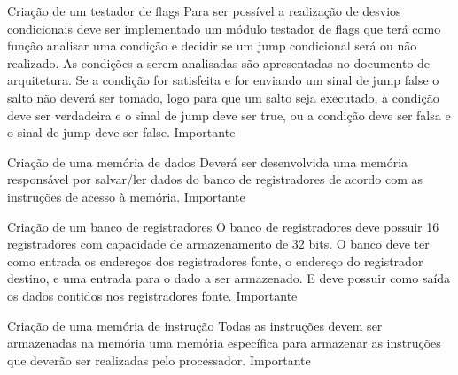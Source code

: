 \documentclass{report}
\begin{document}
\begin{functional}
      \requirement
      {Criação de um testador de flags}
      {Para ser possível a realização de desvios condicionais deve ser implementado um módulo testador de flags que terá como função analisar uma condição e decidir se um jump condicional será ou não realizado. As condições a serem analisadas são apresentadas no documento de arquitetura. Se a condição for satisfeita e for enviando um sinal de jump false o salto não deverá ser tomado, logo para que um salto seja executado,  a condição deve ser verdadeira e o sinal de jump deve ser true, ou a condição deve ser falsa e o sinal de jump deve ser false. }
      {Importante}
      
       \requirement
      {Criação de uma memória de dados}
      {Deverá ser desenvolvida uma memória responsável por salvar/ler dados do banco de registradores de acordo com as instruções de acesso à memória.  }
      {Importante}
      
       \requirement
      {Criação de um banco de registradores}
      {O banco de registradores deve possuir 16 registradores com capacidade de armazenamento de 32 bits. O banco deve ter como entrada os endereços dos registradores fonte, o endereço do registrador destino, e uma entrada para o dado a ser armazenado. E deve possuir como saída os dados contidos nos registradores fonte.}
      {Importante}
      
       \requirement
      {Criação de uma memória de instrução}
      {Todas as instruções devem ser armazenadas na memória uma memória específica para armazenar as instruções que deverão ser realizadas pelo processador.}
      {Importante}
    
      \end{functional}
      
\end{document}
